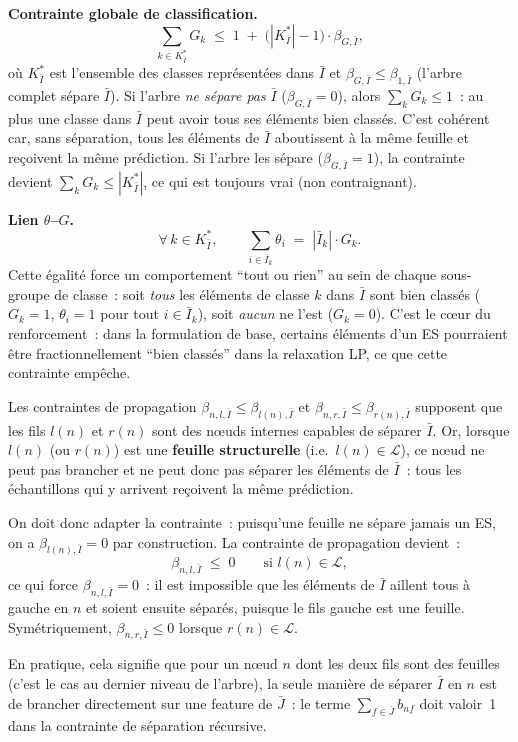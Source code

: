 \documentclass[a4paper,10pt,titlepage,leqno]{article}
\begin{document}
\begin{theorybox}
\medskip

\textbf{Contrainte globale de classification.}
\[
  \sum_{k \in K^*_{\bar{I}}} G_k \;\leq\; 1 \;+\; \bigl(|K^*_{\bar{I}}| - 1\bigr) \cdot \beta_{G,\bar{I}},
\]
où $K^*_{\bar{I}}$ est l'ensemble des classes représentées dans $\bar{I}$ et $\beta_{G,\bar{I}} \leq \beta_{1,\bar{I}}$ (l'arbre complet sépare $\bar{I}$). Si l'arbre \emph{ne sépare pas} $\bar{I}$ ($\beta_{G,\bar{I}} = 0$), alors $\sum_k G_k \leq 1$~: au plus une classe dans $\bar{I}$ peut avoir tous ses éléments bien classés. C'est cohérent car, sans séparation, tous les éléments de $\bar{I}$ aboutissent à la même feuille et reçoivent la même prédiction. Si l'arbre les sépare ($\beta_{G,\bar{I}} = 1$), la contrainte devient $\sum_k G_k \leq |K^*_{\bar{I}}|$, ce qui est toujours vrai (non contraignant).

\medskip

\textbf{Lien $\theta$--$G$.}
\[
  \forall\, k \in K^*_{\bar{I}}, \qquad \sum_{i \in \bar{I}_k} \theta_i \;=\; |\bar{I}_k| \cdot G_k.
\]
Cette égalité force un comportement ``tout ou rien'' au sein de chaque sous-groupe de classe~: soit \emph{tous} les éléments de classe $k$ dans $\bar{I}$ sont bien classés ($G_k = 1$, $\theta_i = 1$ pour tout $i \in \bar{I}_k$), soit \emph{aucun} ne l'est ($G_k = 0$). C'est le cœur du renforcement~: dans la formulation de base, certains éléments d'un ES pourraient être fractionnellement ``bien classés'' dans la relaxation LP, ce que cette contrainte empêche.
\end{theorybox}

\begin{theorybox}

Les contraintes de propagation $\beta_{n,l,\bar{I}} \leq \beta_{l(n),\bar{I}}$ et $\beta_{n,r,\bar{I}} \leq \beta_{r(n),\bar{I}}$ supposent que les fils $l(n)$ et $r(n)$ sont des nœuds internes capables de séparer $\bar{I}$. Or, lorsque $l(n)$ (ou $r(n)$) est une \textbf{feuille structurelle} (i.e.\ $l(n) \in \mathcal{L}$), ce nœud ne peut pas brancher et ne peut donc pas séparer les éléments de $\bar{I}$~: tous les échantillons qui y arrivent reçoivent la même prédiction.

On doit donc adapter la contrainte~: puisqu'une feuille ne sépare jamais un ES, on a $\beta_{l(n),\bar{I}} = 0$ par construction. La contrainte de propagation devient~:
\[
  \beta_{n,l,\bar{I}} \;\leq\; 0 \qquad \text{si } l(n) \in \mathcal{L},
\]
ce qui force $\beta_{n,l,\bar{I}} = 0$~: il est impossible que les éléments de $\bar{I}$ aillent tous à gauche en $n$ et soient ensuite séparés, puisque le fils gauche est une feuille. Symétriquement, $\beta_{n,r,\bar{I}} \leq 0$ lorsque $r(n) \in \mathcal{L}$.

En pratique, cela signifie que pour un nœud $n$ dont les deux fils sont des feuilles (c'est le cas au dernier niveau de l'arbre), la seule manière de séparer $\bar{I}$ en $n$ est de brancher directement sur une feature de $\bar{J}$~: le terme $\sum_{f \in \bar{J}} b_{nf}$ doit valoir~1 dans la contrainte de séparation récursive.
\end{theorybox}
\end{document}
